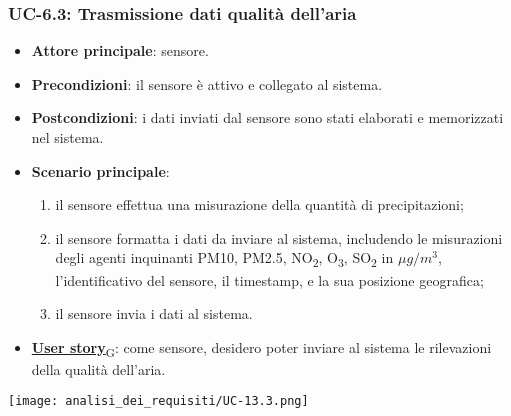 \subsubsection{UC-6.3: Trasmissione dati qualità dell'aria}
\begin{itemize}
	\item \textbf{Attore principale}: sensore.
	\item \textbf{Precondizioni}: il sensore è attivo e collegato al sistema.
	\item \textbf{Postcondizioni}: i dati inviati dal sensore sono stati elaborati e memorizzati nel sistema.
	\item \textbf{Scenario principale}:
	      \begin{enumerate}
		      \item il sensore effettua una misurazione della quantità di precipitazioni;
		      \item il sensore formatta i dati da inviare al sistema, includendo le misurazioni degli agenti inquinanti PM10, PM2.5, NO\textsubscript{2}, O\textsubscript{3}, SO\textsubscript{2}
		            in $\mu g/m^3$, l'identificativo del sensore, il timestamp, e la sua posizione geografica;
		      \item il sensore invia i dati al sistema.
	      \end{enumerate}
	\item \href{https://7last.github.io/docs/rtb/documentazione-interna/glossario\#user-story}{\textbf{User story}\textsubscript{G}}:
	      come sensore, desidero poter inviare al sistema le rilevazioni della qualità dell'aria.
\end{itemize}

\begin{center}
	\texttt{[image: analisi\_dei\_requisiti/UC-13.3.png]}
\end{center}

